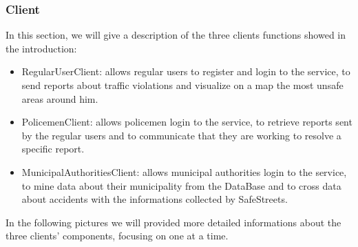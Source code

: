 \subsubsection{Client}
In this section, we will give a description of the three clients functions showed in the introduction:
\begin{itemize}
	\item RegularUserClient: allows regular users to register and login to the service, to send reports about traffic violations and visualize on a map the most unsafe areas around him.
	\item PolicemenClient: allows policemen login to the service, to retrieve reports sent by the regular users and to communicate that they are working to resolve a specific report.
	\item MunicipalAuthoritiesClient: allows municipal authorities login to the service, to mine data about their municipality from the DataBase and to cross data about accidents with the informations collected by SafeStreets.
\end{itemize}
In the following pictures we will provided more detailed informations about the three clients' components, focusing on one at a time.

